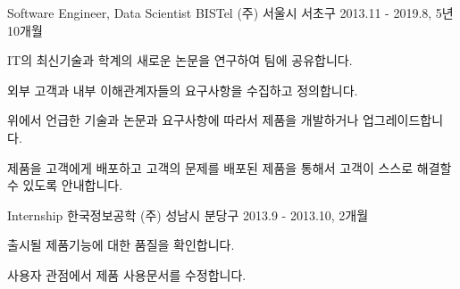

\begin{cventries}

  \cventry
    {Software Engineer, Data Scientist} %
    {BISTel (주)} %
    {서울시 서초구} %
    {2013.11 - 2019.8, 5년 10개월} %
    {
      \begin{cvitems} %
        \item {IT의 최신기술과 학계의 새로운 논문을 연구하여 팀에 공유합니다.}
        \item {외부 고객과 내부 이해관계자들의 요구사항을 수집하고 정의합니다.}
        \item {위에서 언급한 기술과 논문과 요구사항에 따라서 제품을 개발하거나 업그레이드합니다.}
        \item {제품을 고객에게 배포하고 고객의 문제를 배포된 제품을 통해서 고객이 스스로 해결할 수 있도록 안내합니다.}
      \end{cvitems}
    }

  \cventry
    {Internship} %
    {한국정보공학 (주)} %
    {성남시 분당구} %
    {2013.9 - 2013.10, 2개월} %
    {
      \begin{cvitems} %
        \item {출시될 제품기능에 대한 품질을 확인합니다.}
        \item {사용자 관점에서 제품 사용문서를 수정합니다.}
      \end{cvitems}
    }

\end{cventries}
